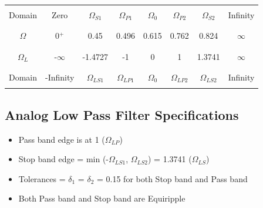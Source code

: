\documentclass[12pt]{article}
\begin{document}
\begin{center}
	\begin{tabular}{ |c|c|c|c|c|c|c|c| }
		\hline
		&&&&&&&\\
		Domain &Zero & $\Omega_{S1}$ & $\Omega_{P1}$ &$\Omega_0$ &$\Omega_{P2}$& $\Omega_{S2}$ &Infinity\\
		&&&&&&&\\
		\hline
		&&&&&&&\\
		$\Omega$ & 0$^+$ & 0.45 & 0.496 &0.615 &0.762& 0.824 & $\infty$\\
		&&&&&&&\\
		\hline
		&&&&&&&\\
		$\Omega_L$ & -$\infty$ & -1.4727 & -1 & 0 &1 & 1.3741 & $\infty$\\
		&&&&&&&\\
		\hline
		&&&&&&&\\
		Domain& -Infinity & $\Omega_{LS1}$ & $\Omega_{LP1}$ &$\Omega_0$ &$\Omega_{LP2}$& $\Omega_{LS2}$ &Infinity\\
		&&&&&&&\\
		\hline
	\end{tabular}
\end{center}
 
\color{cyan}
\subsection{Analog Low Pass Filter Specifications}
\color{black}
\begin{itemize}
	\item Pass band edge is at 1 ($\Omega_{LP}$)
	\item Stop band edge = min (-$\Omega_{LS1}$, $\Omega_{LS2}$) = 1.3741 ($\Omega_{LS}$)
	\item Tolerances = $\delta_1$ = $\delta_2$ = 0.15 for both Stop band and Pass band
	\item Both Pass band and Stop band are Equiripple
\end{itemize}

\color{cyan}
\end{document}
